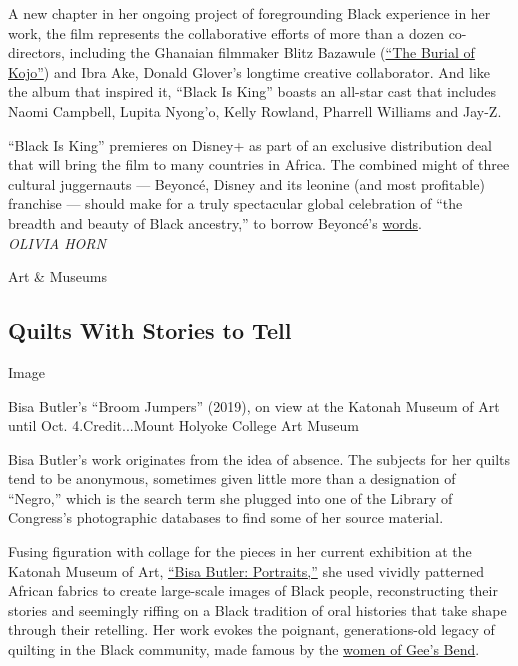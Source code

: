 A new chapter in her ongoing project of foregrounding Black experience
in her work, the film represents the collaborative efforts of more than
a dozen co-directors, including the Ghanaian filmmaker Blitz Bazawule
(\href{https://www.nytimes3xbfgragh.onion/2019/03/28/movies/the-burial-of-kojo-review.html}{``The
Burial of Kojo''}) and Ibra Ake, Donald Glover's longtime creative
collaborator. And like the album that inspired it, ``Black Is King''
boasts an all-star cast that includes Naomi Campbell, Lupita Nyong'o,
Kelly Rowland, Pharrell Williams and Jay-Z.

``Black Is King'' premieres on Disney+ as part of an exclusive
distribution deal that will bring the film to many countries in Africa.
The combined might of three cultural juggernauts --- Beyoncé, Disney and
its leonine (and most profitable) franchise --- should make for a truly
spectacular global celebration of ``the breadth and beauty of Black
ancestry,'' to borrow Beyoncé's
\href{https://www.instagram.com/p/CCAMxfrHjAL/}{words}.\\
\emph{OLIVIA HORN}

Art \& Museums

\hypertarget{quilts-with-stories-to-tell}{%
\subsection{Quilts With Stories to
Tell}\label{quilts-with-stories-to-tell}}

Image

Bisa Butler's ``Broom Jumpers'' (2019), on view at the Katonah Museum of
Art until Oct. 4.Credit...Mount Holyoke College Art Museum

Bisa Butler's work originates from the idea of absence. The subjects for
her quilts tend to be anonymous, sometimes given little more than a
designation of ``Negro,'' which is the search term she plugged into one
of the Library of Congress's photographic databases to find some of her
source material.

Fusing figuration with collage for the pieces in her current exhibition
at the Katonah Museum of Art,
\href{http://www.katonahmuseum.org/exhibitions/}{``Bisa Butler:
Portraits,''} she used vividly patterned African fabrics to create
large-scale images of Black people, reconstructing their stories and
seemingly riffing on a Black tradition of oral histories that take shape
through their retelling. Her work evokes the poignant, generations-old
legacy of quilting in the Black community, made famous by the
\href{https://www.soulsgrowndeep.org/gees-bend-quiltmakers}{women of
Gee's Bend}.

